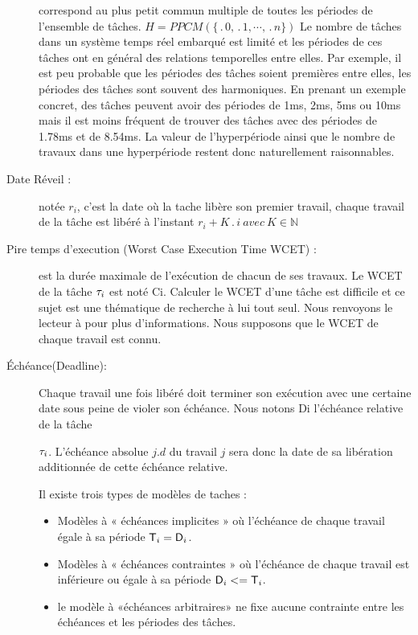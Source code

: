 \begin{description}
  correspond au plus petit commun multiple de toutes les périodes de
  l’ensemble de tâches.  $H =
  PPCM(\{\period{0},\period{1},\cdots,\period{n}\})$ Le nombre de
  tâches dans un système temps réel embarqué est limité et les
  périodes de ces tâches ont en général des relations temporelles
  entre elles. Par exemple, il est peu probable que les périodes des
  tâches soient premières entre elles, les périodes des tâches sont
  souvent des harmoniques. En prenant un exemple concret, des tâches
  peuvent avoir des périodes de 1ms, 2ms, 5ms ou 10ms mais il est
  moins fréquent de trouver des tâches avec des périodes de 1.78ms et
  de 8.54ms. La valeur de l’hyperpériode ainsi que le nombre de
  travaux dans une hyperpériode restent donc naturellement
  raisonnables.
\item[Date Réveil :] notée $r_i$, c’est la date où la tache libère
  son premier travail, chaque travail de la tâche est libéré à
  l’instant $r_{i} + K\period{i}~avec~K \in \mathbb{N}$
\item[Pire temps d’execution (Worst Case Execution Time WCET) :] est
  la durée maximale de l’exécution de chacun de ses travaux. Le WCET
  de la tâche $\tau_{i}$ est noté Ci. Calculer le WCET d’une tâche est
  difficile et ce sujet est une thématique de recherche à lui tout
  seul. Nous renvoyons le lecteur à \cite{WEE+08} pour plus
  d’informations. Nous supposons que le WCET de chaque travail est
  connu.
\item[Échéance(Deadline):] Chaque travail une fois libéré doit
  terminer son exécution avec une certaine date sous peine de violer
  son échéance. Nous notons
  Di l’échéance relative de la tâche

  $\tau_{i}$. L’échéance absolue $j.d$ du travail $j$ sera donc la
  date de sa libération additionnée de cette échéance relative.

Il existe trois types de modèles  de taches : 

\begin{itemize}
\item Modèles à « échéances implicites » où l’échéance de
  chaque travail égale à sa période $\mathsf{T}_{i} = \mathsf{D}_{i}$.
\item Modèles à « échéances contraintes » où l’échéance de
  chaque travail est inférieure ou égale à sa période $\mathsf{D}_{i} <=
  \mathsf{T}_{i}$.
\item le modèle à «échéances arbitraires» ne fixe aucune
  contrainte entre les échéances et les périodes des tâches.
\end{itemize}


\end{description}
